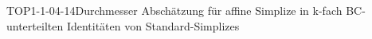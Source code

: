 
\begin{KORO}{TOP1-1-04-14}{Durchmesser Abschätzung für affine Simplize in k-fach BC-unterteilten Identitäten von Standard-Simplizes}
\end{KORO}
